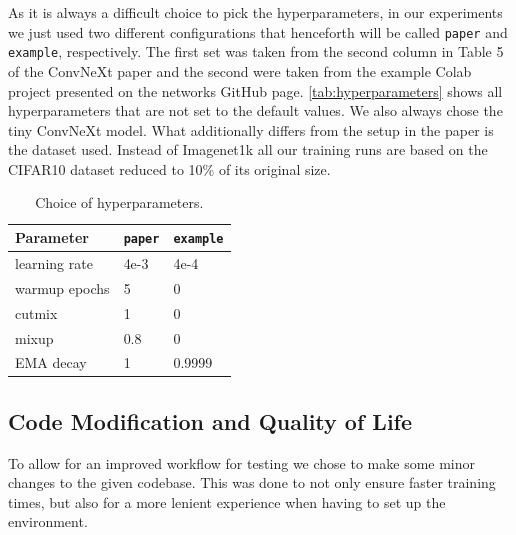 \documentclass{article}
\begin{document}
    As it is always a difficult choice to pick the hyperparameters, in our experiments we just used two different configurations that henceforth will be called \texttt{paper} and \texttt{example}, respectively.
    The first set was taken from the second column in Table 5 of the ConvNeXt\cite{liu2022convnet} paper and the second were taken from the example Colab project presented on the networks GitHub page\cite{ayush0finetune}.
    \autoref{tab:hyperparameters} shows all hyperparameters that are not set to the default values.
    We also always chose the tiny ConvNeXt model.
    What additionally differs from the setup in the paper is the dataset used.
    Instead of Imagenet1k all our training runs are based on the CIFAR10\cite{krizhevsky2009learning} dataset reduced to 10\% of its original size.
    \begin{table}[h]
        \caption{Choice of hyperparameters.}
        \begin{center}
            \begin{tabular}{lll}
                \hline
                Parameter     & \texttt{paper} & \texttt{example} \\ \hline
                learning rate & 4e-3           & 4e-4             \\
                warmup epochs & 5              & 0                \\
                cutmix        & 1              & 0                \\
                mixup         & 0.8            & 0                \\
                EMA decay     & 1              & 0.9999
            \end{tabular}
        \end{center}
        \label{tab:hyperparameters}
    \end{table}

    \subsection{Code Modification and Quality of Life}\label{subsec:code-modification}
    To allow for an improved workflow for testing we chose to make some minor changes to the given codebase.
    This was done to not only ensure faster training times, but also for a more lenient experience when having to set up the environment.
\end{document}
